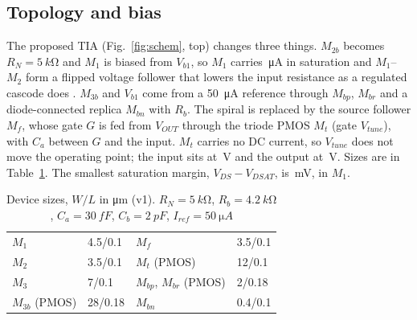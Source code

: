 \documentclass[conference]{IEEEtran}
\begin{document}
\subsection{Topology and bias}
The proposed TIA (Fig.~\ref{fig:schem}, top) changes three things. $M_{2b}$ becomes $R_N=\SI{5}{k\ohm}$ and $M_1$ is biased from $V_{b1}$, so $M_1$ carries \IOne\,\si{\micro A} in saturation and $M_1$--$M_2$ form a flipped voltage follower \cite{fvf} that lowers the input resistance as a regulated cascode does \cite{park}. $M_{3b}$ and $V_{b1}$ come from a \SI{50}{\micro A} reference through $M_{bp}$, $M_{br}$ and a diode-connected replica $M_{bn}$ with $R_b$. The spiral is replaced by the source follower $M_f$, whose gate $G$ is fed from $V_{OUT}$ through the triode PMOS $M_t$ (gate $V_{tune}$), with $C_a$ between $G$ and the input. $M_t$ carries no DC current, so $V_{tune}$ does not move the operating point; the input sits at \Vin\,V and the output at \Vout\,V. Sizes are in Table~\ref{tab:sizes}. The smallest saturation margin, $V_{DS}-V_{DSAT}$, is \OvMOne\,mV, in $M_1$.

\begin{table}[t]
\caption{Device sizes, $W/L$ in \si{\micro m} (v1). $R_N=\SI{5}{k\ohm}$, $R_b=\SI{4.2}{k\ohm}$, $C_a=\SI{30}{fF}$, $C_b=\SI{2}{pF}$, $I_{ref}=\SI{50}{\micro A}$}
\label{tab:sizes}
\centering\footnotesize\setlength{\tabcolsep}{4pt}
\begin{tabular}{llll}
\toprule
$M_1$ & 4.5/0.1 & $M_f$ & 3.5/0.1 \\
$M_2$ & 3.5/0.1 & $M_t$ (PMOS) & 12/0.1 \\
$M_3$ & 7/0.1 & $M_{bp}$, $M_{br}$ (PMOS) & 2/0.18 \\
$M_{3b}$ (PMOS) & 28/0.18 & $M_{bn}$ & 0.4/0.1 \\
\bottomrule
\end{tabular}
\end{table}
\end{document}
